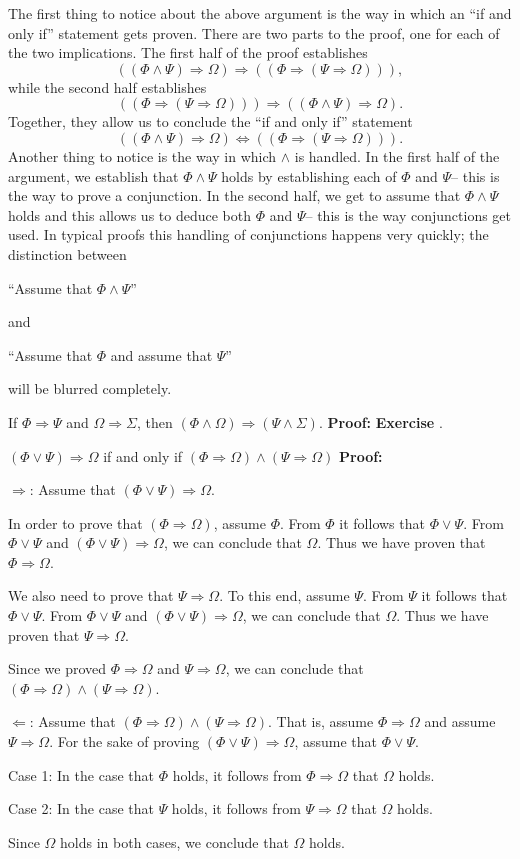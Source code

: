 \documentclass[12pt]{article}
\newcommand{\AND}{\wedge}
\newcommand{\OR}{\vee}
\newcommand{\ARR}{\Rightarrow}
\newcommand{\DARR}{\Leftrightarrow}
\newcounter{exercise}
\newcounter{rule}
\def\putExerciseHeading{\refstepcounter{exercise} \textbf{Exercise \theexercise}}
\def\putRuleNumber{\refstepcounter{rule}\therule}
\newcommand{\DRULEPF}[3]{\begin{tcolorbox}[title=Derived Rule \putRuleNumber: #1,colbacktitle=white,coltitle=black,colback=white] {#2} \tcblower \textbf{Proof:} {#3} \end{tcolorbox}}
\newcommand{\DRULEPZ}[2]{\begin{tcolorbox}[title=Derived Rule \putRuleNumber: #1,colbacktitle=white,coltitle=black,colback=white] {#2} \tcblower \textbf{Proof:} 
                         \putExerciseHeading. \end{tcolorbox}}
\def\pA{\Phi}
\def\pB{\Psi}
\def\pC{\Omega}
\def\pD{\Sigma}
\begin{document}
The first thing to notice about the above argument is the way in which an ``if and only if'' statement gets proven.
There are two parts to the proof, one for each of the two implications.
The first half of the proof establishes 
$$((\pA\AND\pB)\ARR\pC)\ARR((\pA\ARR(\pB\ARR\pC))),$$
while the second half establishes
$$((\pA\ARR(\pB\ARR\pC)))\ARR((\pA\AND\pB)\ARR\pC).$$
Together, they allow us to conclude the ``if and only if'' statement
$$((\pA\AND\pB)\ARR\pC)\DARR((\pA\ARR(\pB\ARR\pC))).$$
Another thing to notice is the way in which $\AND$ is handled.
In the first half of the argument, we establish that $\pA\AND\pB$ holds by establishing each of $\pA$ and $\pB$-- this is the way to prove a conjunction.
In the second half, we get to assume that $\pA\AND\pB$ holds and this allows us to deduce both $\pA$ and $\pB$-- this is the way conjunctions get used.
In typical proofs this handling of conjunctions happens very quickly; the distinction between
\begin{center} ``Assume that $\pA\AND\pB$''\end{center}
and
\begin{center} ``Assume that $\pA$ and assume that $\pB$''\end{center}
will be blurred completely.

\DRULEPZ{}{If $\pA\ARR\pB$ and $\pC\ARR\pD$, then $(\pA\AND\pC)\ARR(\pB\AND\pD)$.}

\DRULEPF{Disjunction and Implication}{
$(\pA\OR\pB)\ARR\pC$ if and only if $(\pA\ARR\pC)\AND(\pB\ARR\pC)$
}{
$\Rightarrow$:
Assume that $(\pA\OR\pB)\ARR\pC$.
\lsp

In order to prove that $(\pA\ARR\pC)$, assume $\pA$.
From $\pA$ it follows that $\pA\OR\pB$.
From $\pA\OR\pB$ and $(\pA\OR\pB)\ARR\pC$, we can conclude that $\pC$.
Thus we have proven that $\pA\ARR\pC$.
\lsp

We also need to prove that $\pB\ARR\pC$. To this end, assume $\pB$.
From $\pB$ it follows that $\pA\OR\pB$.
From $\pA\OR\pB$ and $(\pA\OR\pB)\ARR\pC$, we can conclude that $\pC$.
Thus we have proven that $\pB\ARR\pC$.
\lsp

Since we proved $\pA\ARR\pC$ and $\pB\ARR\pC$, we can conclude that $(\pA\ARR\pC)\AND(\pB\ARR\pC)$.
\lsp

$\Leftarrow$: 
Assume that $(\pA\ARR\pC)\AND(\pB\ARR\pC)$.
That is, assume  $\pA\ARR\pC$ and assume $\pB\ARR\pC$.
For the sake of proving $(\pA\OR\pB)\ARR\pC$, assume that $\pA\OR\pB$.
\lsp

Case 1: In the case that $\pA$ holds, it follows from $\pA\ARR\pC$ that $\pC$ holds.
\lsp

Case 2: In the case that $\pB$ holds, it follows from $\pB\ARR\pC$ that $\pC$ holds.
\lsp

Since $\pC$ holds in both cases, we conclude that $\pC$ holds.
}
\end{document}
